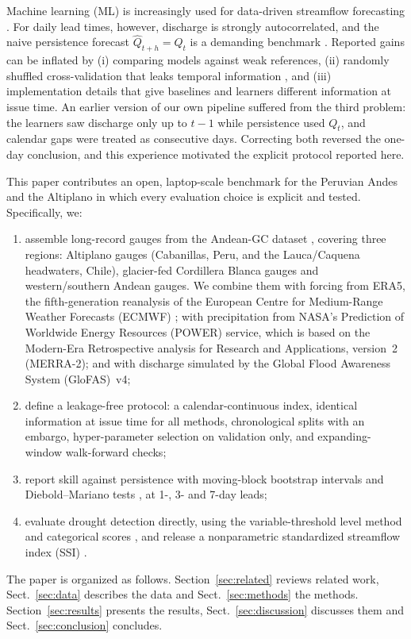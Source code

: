 \documentclass[graybox]{svmult}
\begin{document}
Machine learning (ML) is increasingly used for data-driven streamflow forecasting \cite{yaseen2015ai,mosavi2018flood,kratzert2018lstm,kratzert2019lstm,nearing2021role}. For daily lead times, however, discharge is strongly autocorrelated, and the naive persistence forecast $\hat{Q}_{t+h}=Q_t$ is a demanding benchmark \cite{pappenberger2015benchmarks,murphy1988skill}. Reported gains can be inflated by (i) comparing models against weak references, (ii) randomly shuffled cross-validation that leaks temporal information \cite{bergmeir2012cv,roberts2017cv,torres2026blockedcv}, and (iii) implementation details that give baselines and learners different information at issue time. An earlier version of our own pipeline suffered from the third problem: the learners saw discharge only up to $t-1$ while persistence used $Q_t$, and calendar gaps were treated as consecutive days. Correcting both reversed the one-day conclusion, and this experience motivated the explicit protocol reported here.

This paper contributes an open, laptop-scale benchmark for the Peruvian Andes and the Altiplano in which every evaluation choice is explicit and tested. Specifically, we:
\begin{enumerate}
\item assemble \nGauges{} long-record gauges from the Andean-GC dataset \cite{aguayo2026andeangc}, covering three regions: \nGaugesAlti{} Altiplano gauges (Cabanillas, Peru, and the Lauca/Caquena headwaters, Chile), \nGaugesCB{} glacier-fed Cordillera Blanca gauges and \nGaugesWSA{} western/southern Andean gauges. We combine them with forcing from ERA5, the fifth-generation reanalysis of the European Centre for Medium-Range Weather Forecasts (ECMWF) \cite{hersbach2020era5}; with precipitation from NASA's Prediction of Worldwide Energy Resources (POWER) service, which is based on the Modern-Era Retrospective analysis for Research and Applications, version~2 (MERRA-2); and with discharge simulated by the Global Flood Awareness System (GloFAS)~v4;
\item define a leakage-free protocol: a calendar-continuous index, identical information at issue time for all methods, chronological splits with an embargo, hyper-parameter selection on validation only, and expanding-window walk-forward checks;
\item report skill against persistence with moving-block bootstrap intervals \cite{kunsch1989block} and Diebold--Mariano tests \cite{diebold1995dm,harvey1997dm}, at 1-, 3- and 7-day leads;
\item evaluate drought detection directly, using the variable-threshold level method \cite{vanloon2015explained,fleig2006threshold} and categorical scores \cite{schaefer1990csi}, and release a nonparametric standardized streamflow index (SSI) \cite{farahmand2015nonparametric}.
\end{enumerate}
The paper is organized as follows. Section~\ref{sec:related} reviews related work, Sect.~\ref{sec:data} describes the data and Sect.~\ref{sec:methods} the methods. Section~\ref{sec:results} presents the results, Sect.~\ref{sec:discussion} discusses them and Sect.~\ref{sec:conclusion} concludes.
\end{document}
